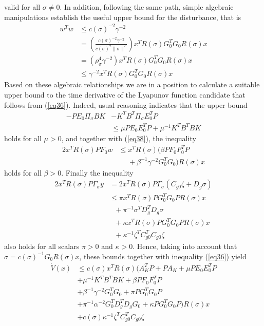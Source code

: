 \documentclass[twocolumn]{autarc_LH}
\begin{document}
valid for all $\sigma \neq 0$. In addition, following the same path, simple algebraic manipulations establish the useful upper bound for the disturbance, that is 
\begin{align}
\label{eq38} w^Tw  & \leq  c(\sigma)^{-2} \gamma^{-2}    \nonumber \\
& =  \left ( \frac{c(\sigma)^{-2} \gamma^{-2}}{c(\sigma)^2 \|\sigma\|^2} \right ) x^T R(\sigma)G_0^TG_0R(\sigma)x \nonumber \\
& = \left ( \rho_\sigma^4 \gamma^{-2} \right )  x^T R(\sigma)G_0^TG_0R(\sigma)x \nonumber \\
& \leq \gamma^{-2} x^T R(\sigma)G_0^TG_0R(\sigma)x
\end{align} 
Based on these algebraic relationships we are in a position to calculate a suitable upper bound to the time derivative of the Lyapunov function candidate that follows from (\ref{eq36}). Indeed, usual reasoning indicates that the upper bound 
\begin{align}
\label{eq39} -PE_0\Pi_\sigma BK & - K^T B^T \Pi_\sigma E_0^T P \nonumber \\
& \leq \mu PE_0E_0^TP + \mu^{-1}K^TB^TBK
\end{align}
holds for all $\mu > 0$, and together with (\ref{eq38}), the inequality
\begin{align}
\label{eq40} 2x^TR(\sigma)PF_0w & \leq x^TR(\sigma)\Big ( \beta PF_0F_0^TP \nonumber \\
& ~~~~~~ + \beta^{-1} \gamma^{-2} G_0^TG_0 \Big ) R(\sigma) x
\end{align}
holds for all $\beta >0$. Finally the inequality
\begin{align}
\label{eq41} 2x^TR(\sigma)P\Gamma_\sigma y & = 2x^TR(\sigma)P\Gamma_\sigma (C_{g0}\zeta + D_g \sigma ) \nonumber \\
& \leq \pi x^TR(\sigma) PG_0^TG_0P  R(\sigma) x \nonumber \\ & ~~~+ \pi^{-1} \sigma^TD_g^TD_g \sigma \nonumber \\
& ~~~+ \kappa  x^TR(\sigma)PG_0^TG_0PR(\sigma)x \nonumber \\ & ~~~+   \kappa^{-1} \zeta^TC_{g0}^TC_{g0}\zeta
\end{align}
also holds for all scalars $\pi>0$ and $\kappa>0$. Hence, taking into account that $\sigma = c(\sigma)^{-1} G_{0} R(\sigma)x$, these bounds together with inequality (\ref{eq36}) yield
\begin{align}
\label{eq42} \dot  V(x) & \leq  c(\sigma) x^T R(\sigma) \Big ( A_K^T P + P A_K + \mu PE_0E_0^TP \nonumber \\
& + \mu^{-1}K^TB^TBK + \beta PF_0F_0^TP \nonumber \\
& + \beta^{-1} \gamma^{-2} G_0^TG_0 + \pi PG_0^TG_0P  \nonumber \\
& + \pi^{-1} \alpha^{-2} G_{0}^TD_g^TD_gG_{0} + \kappa PG_0^TG_0P  \Big ) R(\sigma)x \nonumber \\
&  + c(\sigma) \kappa^{-1} \zeta^TC_{g0}^TC_{g0}\zeta
\end{align}
\end{document}
